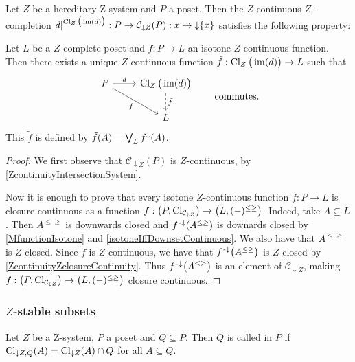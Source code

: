 \begin{corollary} \label{ZcontinuousExtensionZcontinuousFunction}
Let $Z$ be a hereditary $\mathrm{Z}$-system and $P$ a poset. Then the $Z$-continuous $Z$-completion $d|^{\operatorname{Cl}_{Z}\big(\operatorname{im}(d)\big)}: P \to \mathcal{C}_{\downarrow Z}(P): x\mapsto \operatorname{\downarrow}\{x\}$ satisfies the following property:

Let $L$ be a $Z$-complete poset and $f: P \to L$ an isotone $Z$-continuous function. Then there exists a unique $Z$-continuous function $\tilde{f}: \operatorname{Cl}_{Z}\big(\operatorname{im}(d)\big) \to L$ such that
\[ \begin{tikzcd}
P \ar[r, "d"] \ar[dr, swap, "f"] & \Closure_{Z}\big(\im(d)\big) \ar[d, dashed, "{\tilde{f}}"] \\ {} & L
\end{tikzcd} \qquad \text{commutes.} \]
This $\tilde{f}$ is defined by $\tilde{f}(A) = \bigvee_L f^\downarrow(A)$.
\end{corollary}
\begin{proof}
We first observe that $\mathcal{C}_{\downarrow Z}(P)$ is $Z$-continuous, by \ref{ZcontinuityIntersectionSystem}.

Now it is enough to prove that every isotone $Z$-continuous function $f: P \to L$ is closure-continuous as a function $f: \sSet{P, \Closure_{\mathcal{C}_{\downarrow Z}}}\to \sSet{L, (-)^{\leq\geq}}$. Indeed, take $A\subseteq L$. Then $A^{\leq\geq}$ is downwards closed and $f^{\text{\hspace{0.15em}-}\downarrow}(A^{\leq\geq})$ is downards closed by \ref{MfunctionIsotone} and \ref{isotoneIffDownsetContinuous}. We also have that $A^{\leq\geq}$ is $Z$-closed. Since $f$ is $Z$-continuous, we have that $f^{\text{\hspace{0.15em}-}\downarrow}\big(A^{\leq\geq}\big)$ is $Z$-closed by \ref{ZcontinuityZclosureContinuity}. Thus $f^{\text{\hspace{0.15em}-}\downarrow}\big(A^{\leq\geq}\big)$ is an element of $\mathcal{C}_{\downarrow Z}$, making $f: \sSet{P, \Closure_{\mathcal{C}_{\downarrow Z}}}\to \sSet{L, (-)^{\leq\geq}}$ closure continuous.
\end{proof}


\subsubsection{$Z$-stable subsets}
\begin{definition}
Let $Z$ be a $\mathrm{Z}$-system, $P$ a poset and $Q\subseteq P$. Then $Q$ is called  in $P$ if $\operatorname{Cl}_{\downarrow Z, Q}(A) = \operatorname{Cl}_{\downarrow Z}(A) \cap Q$ for all $A\subseteq Q$.
\end{definition}

